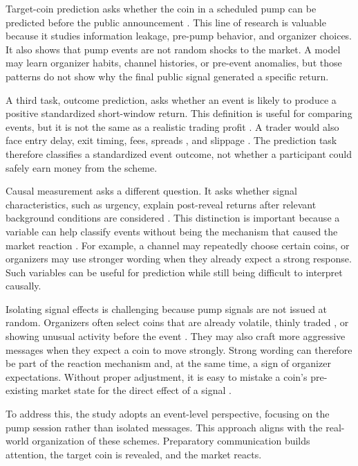 Target-coin prediction asks whether the coin in a scheduled pump can be predicted before the public announcement \cite{hu2023sequence}. This line of research is valuable because it studies information leakage, pre-pump behavior, and organizer choices. It also shows that pump events are not random shocks to the market. A model may learn organizer habits, channel histories, or pre-event anomalies, but those patterns do not show why the final public signal generated a specific return.

A third task, outcome prediction, asks whether an event is likely to produce a positive standardized short-window return. This definition is useful for comparing events, but it is not the same as a realistic trading profit \cite{mackinlay1997event}. A trader would also face entry delay, exit timing, fees, spreads \cite{amihud2002illiquidity}, and slippage \cite{kyle1985continuous}. The prediction task therefore classifies a standardized event outcome, not whether a participant could safely earn money from the scheme.

Causal measurement asks a different question. It asks whether signal characteristics, such as urgency, explain post-reveal returns after relevant background conditions are considered \cite{rubin1974estimating, angrist2009mostly}. This distinction is important because a variable can help classify events without being the mechanism that caused the market reaction \cite{shmueli2010explain}. For example, a channel may repeatedly choose certain coins, or organizers may use stronger wording when they already expect a strong response. Such variables can be useful for prediction while still being difficult to interpret causally.

Isolating signal effects is challenging because pump signals are not issued at random. Organizers often select coins that are already volatile, thinly traded \cite{charfeddine2024drives}, or showing unusual activity before the event \cite{li2021cryptocurrency}. They may also craft more aggressive messages when they expect a coin to move strongly. Strong wording can therefore be part of the reaction mechanism and, at the same time, a sign of organizer expectations. Without proper adjustment, it is easy to mistake a coin's pre-existing market state for the direct effect of a signal \cite{angrist2009mostly}.

To address this, the study adopts an event-level perspective, focusing on the pump session rather than isolated messages. This approach aligns with the real-world organization of these schemes. Preparatory communication builds attention, the target coin is revealed, and the market reacts.

